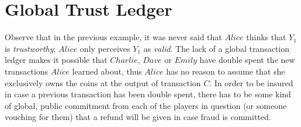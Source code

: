 \section{Global Trust Ledger}
  Observe that in the previous example, it was never said that $Alice$ thinks that $Y_1$
  is \textit{trustworthy}; $Alice$ only perceives $Y_1$ as \textit{valid}. The lack of a
  global transaction ledger makes it possible that $Charlie$, $Dave$ or $Emily$ have
  double spent the new transactions $Alice$ learned about, thus $Alice$ has no reason to
  assume that she exclusively owns the coins at the output of transaction $C$. In order to
  be insured in case a previous transaction has been double spent, there has to be some
  kind of global, public commitment from each of the players in question (or someone
  vouching for them) that a refund will be given in case fraud is committed.
